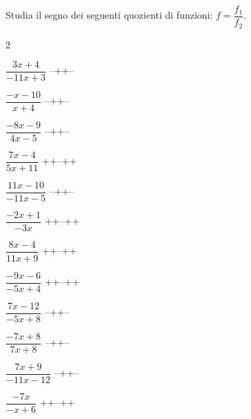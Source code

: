 \begin{esercizio}\label{ese:dis_7}
Studia il segno dei seguenti quozienti di funzioni: 
\(f = \dfrac {f_1}{f_2}\).
\begin{htmulticols}{2}
\begin{enumeratea}
\item  \(\dfrac{3 x +4}{-11 x +3}\) \sol 
{--++--}
\item  \(\dfrac{- x -10}{x +4}\) \sol 
{--++--}
\item  \(\dfrac{-8 x -9}{4 x -5}\) \sol 
{--++--}
\item  \(\dfrac{7 x -4}{5 x +11}\) \sol 
{++--++}
\item  \(\dfrac{11 x -10}{-11 x -5}\) \sol 
{--++--}
\item  \(\dfrac{-2 x +1}{-3 x }\) \sol 
{++--++}
\item  \(\dfrac{8 x -4}{11 x +9}\) \sol 
{++--++}
\item  \(\dfrac{-9 x -6}{-5 x +4}\) \sol 
{++--++}
\item  \(\dfrac{7 x -12}{-5 x +8}\) \sol 
{--++--}
\item  \(\dfrac{-7 x +8}{7 x +8}\) \sol 
{--++--}
\item  \(\dfrac{7 x +9}{-11 x -12}\) \sol 
{--++--}
\item  \(\dfrac{-7 x }{- x +6}\) \sol 
{++--++}
\end{enumeratea}
\end{htmulticols}
\end{esercizio}

